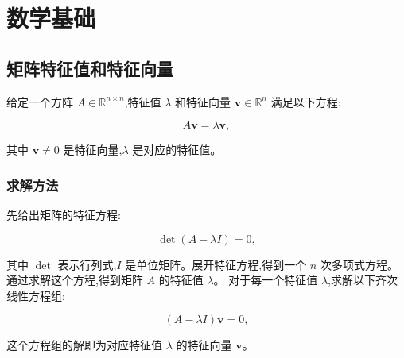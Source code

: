 \chapter{数学基础}\label{chap:background}
\section{矩阵特征值和特征向量}
\begin{defn}[特征值和特征向量]
    给定一个方阵 \( A \in \mathbb{R}^{n \times n} \),特征值 \( \lambda \) 和特征向量 \( \mathbf{v} \in \mathbb{R}^n \) 满足以下方程:

\[
A \mathbf{v} = \lambda \mathbf{v},
\]

其中 \( \mathbf{v} \neq 0 \) 是特征向量,\( \lambda \) 是对应的特征值。
\end{defn}


\subsection*{求解方法}

先给出矩阵的特征方程:

    \[
    \det(A - \lambda I) = 0,
    \]

其中 \( \det \) 表示行列式,\( I \) 是单位矩阵。展开特征方程,得到一个 \( n \) 次多项式方程。通过求解这个方程,得到矩阵 \( A \) 的特征值 \( \lambda \)。 对于每一个特征值 \( \lambda \),求解以下齐次线性方程组:

    \[
    (A - \lambda I) \mathbf{v} = 0,
    \]

这个方程组的解即为对应特征值 \( \lambda \) 的特征向量 \( \mathbf{v} \)。

